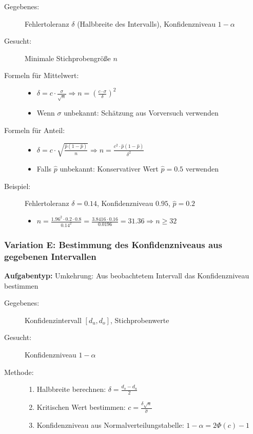 \documentclass[12pt, a4paper, titlepage, ngerman]{scrartcl}
\begin{document}
\begin{description}
  \item[Gegebenes:] Fehlertoleranz $\delta$ (Halbbreite des Intervalls), Konfidenzniveau $1 - \alpha$
  \item[Gesucht:] Minimale Stichprobengröße $n$
  \item[Formeln für Mittelwert:] 
    \begin{itemize}
      \item $\delta = c \cdot \frac{\sigma}{\sqrt{n}} \Rightarrow n = \left(\frac{c \cdot \sigma}{\delta}\right)^2$
      \item Wenn $\sigma$ unbekannt: Schätzung aus Vorversuch verwenden
    \end{itemize}
  \item[Formeln für Anteil:] 
    \begin{itemize}
      \item $\delta = c \cdot \sqrt{\frac{\hat{p}(1-\hat{p})}{n}} \Rightarrow n = \frac{c^2 \cdot \hat{p}(1-\hat{p})}{\delta^2}$
      \item Falls $\hat{p}$ unbekannt: Konservativer Wert $\hat{p} = 0.5$ verwenden
    \end{itemize}
  \item[Beispiel:] Fehlertoleranz $\delta = 0.14$, Konfidenzniveau $0.95$, $\hat{p} = 0.2$
    \begin{itemize}
      \item $n = \frac{1.96^2 \cdot 0.2 \cdot 0.8}{0.14^2} = \frac{3.8416 \cdot 0.16}{0.0196} = 31.36 \Rightarrow n \geq 32$
    \end{itemize}
\end{description}

\subsubsection{Variation E: Bestimmung des Konfidenzniveaus aus gegebenen Intervallen}

\textbf{Aufgabentyp:} Umkehrung: Aus beobachtetem Intervall das Konfidenzniveau bestimmen

\begin{description}
  \item[Gegebenes:] Konfidenzintervall $[d_u, d_o]$, Stichprobenwerte
  \item[Gesucht:] Konfidenzniveau $1 - \alpha$
  \item[Methode:] 
    \begin{enumerate}
      \item Halbbreite berechnen: $\delta = \frac{d_o - d_u}{2}$
      \item Kritischen Wert bestimmen: $c = \frac{\delta \sqrt{n}}{\hat{\sigma}}$
      \item Konfidenzniveau aus Normalverteilungstabelle: $1 - \alpha = 2\Phi(c) - 1$
    \end{enumerate}
\end{description}
\end{document}
